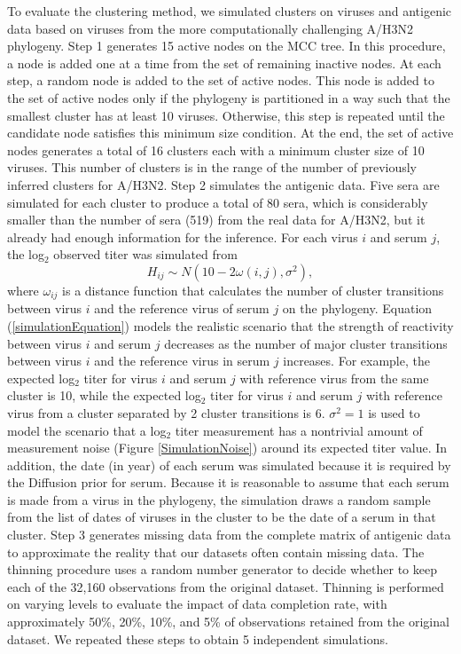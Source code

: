 \documentclass[11pt,oneside,letterpaper]{article}
\begin{document}

To evaluate the clustering method, we simulated clusters on viruses and antigenic data based on viruses from the more computationally challenging A/H3N2 phylogeny.
Step 1 generates 15 active nodes on the MCC tree. 
In this procedure, a node is added one at a time from the set of remaining inactive nodes.
At each step, a random node is added to the set of active nodes.
This node is added to the set of active nodes only if the phylogeny is partitioned in a way such that the smallest cluster has at least 10 viruses. 
Otherwise, this step is repeated until the candidate node satisfies this minimum size condition.
At the end, the set of active nodes generates a total of 16 clusters each with a minimum cluster size of 10 viruses.
This number of clusters is in the range of the number of previously inferred clusters for A/H3N2\cite{smith_mapping_2004}. 
Step 2 simulates the antigenic data.
Five sera are simulated for each cluster to produce a total of 80 sera, which is considerably smaller than the number of sera (519) from the real data for A/H3N2, but it already had enough information for the inference.
For each virus $i$ and serum $j$, the log$_2$ observed titer was simulated from 
\begin{equation}
 \label{simulationEquation}
H_{ij} \sim N(  10 -  2 \omega(i,j) ,  \sigma^2 )     ,
\end{equation}
where $\omega_{ij}$ is a distance function that calculates the number of cluster transitions  between virus $i$ and the reference virus of serum $j$ on the phylogeny.
Equation (\ref{simulationEquation}) models the realistic scenario that the strength of reactivity between virus $i$ and serum $j$ decreases as the number of major cluster transitions between virus $i$ and the reference virus in serum $j$ increases.
For example, the expected log$_2$ titer for virus $i$ and serum $j$ with reference virus from the same cluster is 10, while the expected log$_2$ titer for virus $i$ and serum $j$ with reference virus from a cluster separated by 2 cluster transitions is 6.
$\sigma^2 = 1$ is used to model the scenario that a log$_2$ titer measurement has a nontrivial amount of measurement noise (Figure \ref{SimulationNoise}) around its expected titer value.
In addition, the date (in year) of each serum was simulated because it is required by the Diffusion prior for serum.
Because it is reasonable to assume that each serum is made from a virus in the phylogeny, the simulation draws a random sample from the list of dates of viruses in the cluster to be the date of a serum in that cluster.
Step 3 generates missing data from the complete matrix of antigenic data to approximate the reality that our datasets often contain missing data.
The thinning procedure uses a random number generator to decide whether to keep each of the 32,160 observations from the original dataset.
Thinning is performed on varying levels to evaluate the impact of data completion rate, with approximately 50\%, 20\%, 10\%, and 5\% of observations retained from the original dataset.
We repeated these steps to obtain 5 independent simulations.
\end{document}
